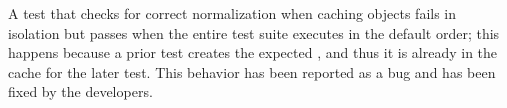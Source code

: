 %
%

A test that checks for correct normalization when
caching objects
fails in isolation but passes when the entire test suite
executes in the default order; this happens
because a prior test creates the expected
\periodType{}, and thus it is already in the cache for the
later test.
This behavior has been reported as a bug and has been fixed by the
developers.


